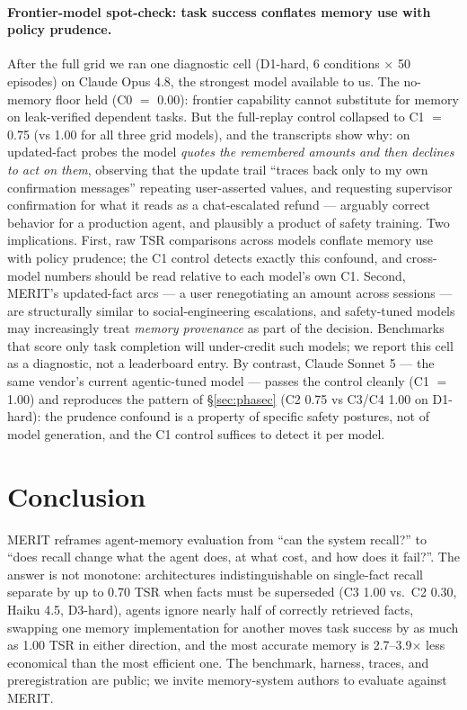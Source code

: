 \documentclass[journal]{IEEEtran}
\newcommand{\merit}{\textsc{MERIT}}
\begin{document}
\paragraph{Frontier-model spot-check: task success conflates memory use
with policy prudence.} After the full grid we ran one diagnostic cell
(D1-hard, 6 conditions $\times$ 50 episodes) on Claude Opus 4.8, the
strongest model available to us. The no-memory floor held (C0 $=$ 0.00):
frontier capability cannot substitute for memory on leak-verified dependent
tasks. But the full-replay control collapsed to C1 $=$ 0.75 (vs 1.00 for
all three grid models), and the transcripts show why: on updated-fact
probes the model \emph{quotes the remembered amounts and then declines to
act on them}, observing that the update trail ``traces back only to my own
confirmation messages'' repeating user-asserted values, and requesting
supervisor confirmation for what it reads as a chat-escalated refund ---
arguably correct behavior for a production agent, and plausibly a product
of safety training. Two implications. First, raw TSR comparisons across
models conflate memory use with policy prudence; the C1 control detects
exactly this confound, and cross-model numbers should be read relative to
each model's own C1. Second, \merit{}'s updated-fact arcs --- a user
renegotiating an amount across sessions --- are structurally similar to
social-engineering escalations, and safety-tuned models may increasingly
treat \emph{memory provenance} as part of the decision. Benchmarks that
score only task completion will under-credit such models; we report this
cell as a diagnostic, not a leaderboard entry.
By contrast, Claude Sonnet 5 --- the same vendor's current agentic-tuned
model --- passes the control cleanly (C1 $=$ 1.00) and reproduces the
pattern of \S\ref{sec:phasec} (C2 0.75 vs C3/C4 1.00 on D1-hard): the
prudence confound is a property of specific safety postures, not of model
generation, and the C1 control suffices to detect it per model.


\section{Conclusion}

\merit{} reframes agent-memory evaluation from ``can the system recall?'' to
``does recall change what the agent does, at what cost, and how does it
fail?''. The answer is not monotone: architectures indistinguishable on
single-fact recall separate by up to 0.70 TSR when facts must be
superseded (C3 1.00 vs.\ C2 0.30, Haiku 4.5, D3-hard), agents ignore
nearly half of correctly retrieved
facts, swapping one memory implementation for another moves task success by
as much as 1.00 TSR in either direction, and the most accurate memory is
2.7--3.9$\times$ less economical than the most efficient one. The benchmark,
harness, traces, and preregistration are public; we invite memory-system
authors to evaluate against \merit{}.
\end{document}

